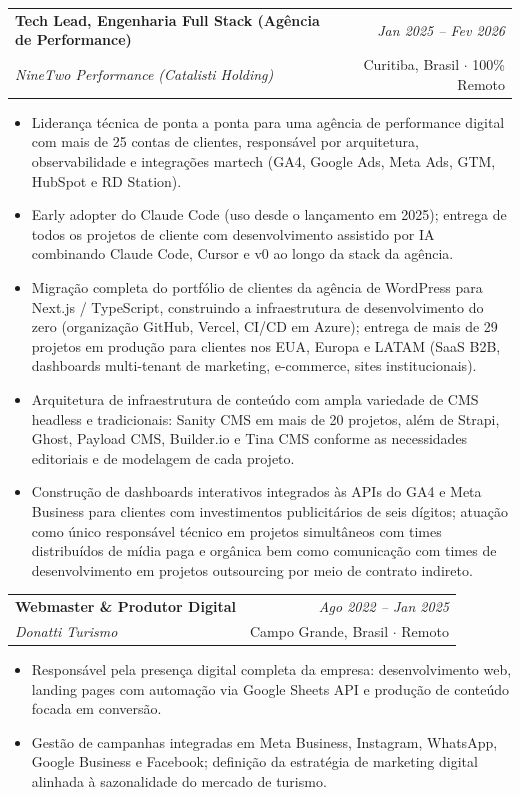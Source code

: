 \documentclass[a4paper,11pt]{article}
\makeatletter
\newcommand{\resumeSubheading}[4]{
\vspace{0.5mm}\item
    \begin{tabular*}{0.98\textwidth}[t]{l@{\extracolsep{\fill}}r}
        \textbf{#1} & \textit{\footnotesize{#4}} \\
        \textit{\footnotesize{#3}} &  \footnotesize{#2}\\
    \end{tabular*}
    \vspace{-2.4mm}
}
\newcommand{\resumeItemListStart}{\begin{justify}\begin{itemize}[leftmargin=3ex, rightmargin=2ex, noitemsep,labelsep=1.2mm,itemsep=0mm]\small}
\newcommand{\resumeItemListEnd}{\end{itemize}\end{justify}\vspace{-2mm}}
\makeatother
\begin{document}
   \resumeSubheading
  {Tech Lead, Engenharia Full Stack (Agência de Performance)}{Curitiba, Brasil $\cdot$ 100\% Remoto}
  {NineTwo Performance (Catalisti Holding)}{Jan 2025 -- Fev 2026}
  \resumeItemListStart
    \item{Liderança técnica de ponta a ponta para uma agência de performance digital com mais de 25 contas de clientes, responsável por arquitetura, observabilidade e integrações martech (GA4, Google Ads, Meta Ads, GTM, HubSpot e RD Station).}
    \item{Early adopter do Claude Code (uso desde o lançamento em 2025); entrega de todos os projetos de cliente com desenvolvimento assistido por IA combinando Claude Code, Cursor e v0 ao longo da stack da agência.}
    \item{Migração completa do portfólio de clientes da agência de WordPress para Next.js / TypeScript, construindo a infraestrutura de desenvolvimento do zero (organização GitHub, Vercel, CI/CD em Azure); entrega de mais de 29 projetos em produção para clientes nos EUA, Europa e LATAM (SaaS B2B, dashboards multi-tenant de marketing, e-commerce, sites institucionais).}
    \item{Arquitetura de infraestrutura de conteúdo com ampla variedade de CMS headless e tradicionais: Sanity CMS em mais de 20 projetos, além de Strapi, Ghost, Payload CMS, Builder.io e Tina CMS conforme as necessidades editoriais e de modelagem de cada projeto.}
    \item{Construção de dashboards interativos integrados às APIs do GA4 e Meta Business para clientes com investimentos publicitários de seis dígitos; atuação como único responsável técnico em projetos simultâneos com times distribuídos de mídia paga e orgânica bem como comunicação com times de desenvolvimento em projetos outsourcing por meio de contrato indireto.
    }
  \resumeItemListEnd

  \resumeSubheading
  {Webmaster \& Produtor Digital}{Campo Grande, Brasil $\cdot$ Remoto}
  {Donatti Turismo}{Ago 2022 -- Jan 2025}
  \resumeItemListStart
    \item{Responsável pela presença digital completa da empresa: desenvolvimento web, landing pages com automação via Google Sheets API e produção de conteúdo focada em conversão.}
    \item{Gestão de campanhas integradas em Meta Business, Instagram, WhatsApp, Google Business e Facebook; definição da estratégia de marketing digital alinhada à sazonalidade do mercado de turismo.}
  \resumeItemListEnd
\end{document}
